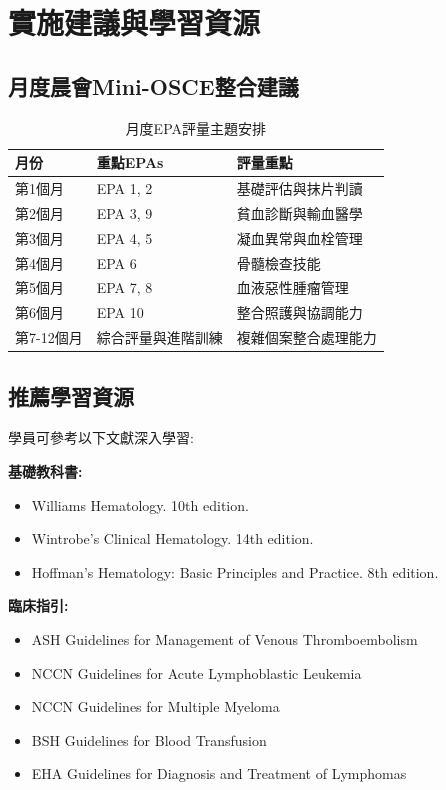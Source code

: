 \documentclass[12pt,a4paper]{article}
\begin{document}
\section{實施建議與學習資源}

\subsection{月度晨會Mini-OSCE整合建議}
\begin{table}[h]
    \centering
    \caption{月度EPA評量主題安排}
    \begin{tabular}{p{2.5cm} p{4.5cm} p{7cm}}
        \toprule
        \textbf{月份} & \textbf{重點EPAs} & \textbf{評量重點} \\
        \midrule
        第1個月 & EPA 1, 2 & 基礎評估與抹片判讀 \\
        第2個月 & EPA 3, 9 & 貧血診斷與輸血醫學 \\
        第3個月 & EPA 4, 5 & 凝血異常與血栓管理 \\
        第4個月 & EPA 6 & 骨髓檢查技能 \\
        第5個月 & EPA 7, 8 & 血液惡性腫瘤管理 \\
        第6個月 & EPA 10 & 整合照護與協調能力 \\
        第7-12個月 & 綜合評量與進階訓練 & 複雜個案整合處理能力 \\
        \bottomrule
    \end{tabular}
\end{table}

\subsection{推薦學習資源}
學員可參考以下文獻深入學習:

\textbf{基礎教科書:}
\begin{itemize}
    \item Williams Hematology. 10th edition.
    \item Wintrobe's Clinical Hematology. 14th edition.
    \item Hoffman's Hematology: Basic Principles and Practice. 8th edition.
\end{itemize}

\textbf{臨床指引:}
\begin{itemize}
    \item ASH Guidelines for Management of Venous Thromboembolism
    \item NCCN Guidelines for Acute Lymphoblastic Leukemia
    \item NCCN Guidelines for Multiple Myeloma
    \item BSH Guidelines for Blood Transfusion
    \item EHA Guidelines for Diagnosis and Treatment of Lymphomas
\end{itemize}
\end{document}
